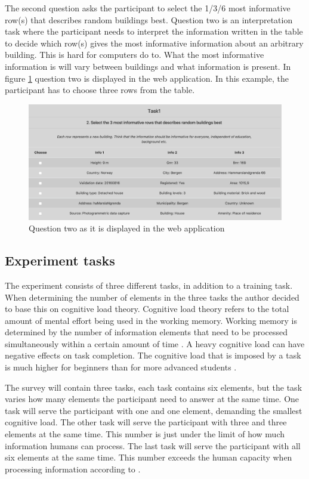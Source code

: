 The second question asks the participant to select the 1/3/6 most informative row(s) that describes random buildings best. Question two is an interpretation task where the participant needs to interpret the information written in the table to decide which row(s) gives the most informative information about an arbitrary building. This is hard for computers do to. What the most informative information is will vary between buildings and what information is present. In figure \ref{fig:q22} question two is displayed in the web application. In this example, the participant has to choose three rows from the table. 

\begin{figure}[H]
	\centering
	\includegraphics[width=0.8\linewidth]{fig/q2_2}
	\caption{Question two as it is displayed in the web application}
	\label{fig:q22}
\end{figure}

\subsection{Experiment tasks}\label{sec:experimenttasks}
The experiment consists of three different tasks, in addition to a training task. When determining the number of elements in the three tasks the author decided to base this on cognitive load theory. Cognitive load theory refers to the total amount of mental effort being used in the working memory. Working memory is determined by the number of information elements that need to be processed simultaneously within a certain amount of time \citep{Barrouillet2007}. A heavy cognitive load can have negative effects on task completion. The cognitive load that is imposed by a task is much higher for beginners than for more advanced students \citep{Leppink2014a}.  

The survey will contain three tasks, each task contains six elements, but the task varies how many elements the participant need to answer at the same time. One task will serve the participant with one and one element, demanding the smallest cognitive load. The other task will serve the participant with three and three elements at the same time. This number is just under the limit of how much information humans can process. The last task will serve the participant with all six elements at the same time. This number exceeds the human capacity when processing information according to \cite{Leppink2014a}. 

